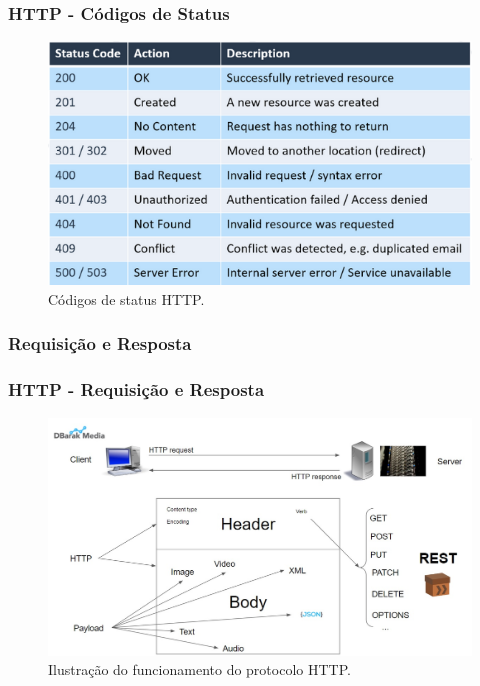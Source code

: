 \documentclass[
	10pt, %
	t, %
]{beamer}
\begin{document}
\begin{frame}
	\frametitle{HTTP - Códigos de Status}

	\begin{figure}
		\centering
		\includegraphics[width=0.9\linewidth]{status_code.png}
		\caption{Códigos de status HTTP.}
		\label{fig:status}
	\end{figure}

\end{frame}

\subsubsection{Requisição e Resposta}

\begin{frame}
	\frametitle{HTTP - Requisição e Resposta}

	\begin{figure}
		\centering
		\includegraphics[width=0.9\linewidth]{http_explained.jpg}
		\caption{Ilustração do funcionamento do protocolo HTTP.}
		\label{fig:http}
	\end{figure}

\end{frame}
\end{document}
